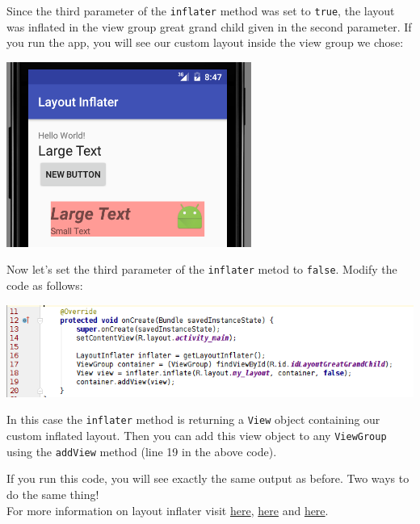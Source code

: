 Since the third parameter of the \texttt{inflater} method was set to \texttt{true}, the layout was inflated in the view group great grand child given in the second parameter. If you run the app, you will see our custom layout inside the view group we chose:

\begin{center}
	\includegraphics[scale=0.4]{chapters/ch06/images/35}
\end{center}

Now let's set the third parameter of the \texttt{inflater} metod to \texttt{false}. Modify the code as follows:

\begin{center}
	\includegraphics[scale=0.4]{chapters/ch06/images/36}
\end{center}

In this case the \texttt{inflater} method is returning a \texttt{View} object containing our custom inflated layout. Then you can add this view object to any \texttt{ViewGroup} using the \texttt{addView} method (line 19 in the above code).

If you run this code, you will see exactly the same output as before. Two ways to do the same thing! \\

For more information on layout inflater visit \href{https://www.bignerdranch.com/blog/understanding-androids-layoutinflater-inflate/}{here},  \href{https://developer.android.com/reference/android/view/LayoutInflater.html}{here} and \href{https://developer.android.com/reference/android/view/LayoutInflater.html#inflate(int,%20android.view.ViewGroup,%20boolean)}{here}.
	
